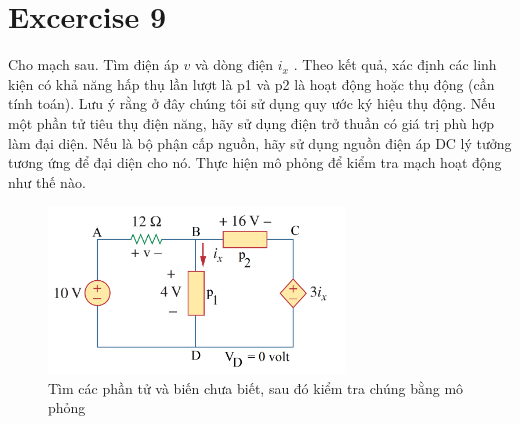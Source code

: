 \section{Excercise 9}
Cho mạch sau. Tìm điện áp \(v\) và dòng điện \(i_x\) . Theo kết quả, xác định các linh kiện có khả năng hấp thụ lần lượt là p1 và p2 là hoạt động hoặc
thụ động (cần tính toán). Lưu ý rằng ở đây chúng tôi sử dụng quy ước ký hiệu thụ động.
Nếu một phần tử tiêu thụ điện năng, hãy sử dụng điện trở thuần có giá trị phù hợp làm đại diện. Nếu là bộ phận cấp nguồn, hãy sử dụng nguồn điện áp DC lý tưởng tương ứng để
đại diện cho nó. Thực hiện mô phỏng để kiểm tra mạch hoạt động như thế nào.
\begin{figure}[!htbp]
    \centering
    \includegraphics[width=0.7\textwidth]{graphics/ex9/f1.png}
    \caption{Tìm các phần tử và biến chưa biết, sau đó kiểm tra chúng bằng mô phỏng}
    \end{figure}

